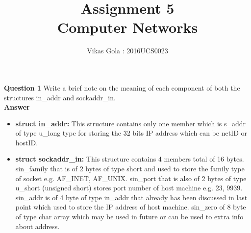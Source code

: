 \documentclass[14pt]{extarticle}
\begin{document}
    \pagestyle{plain}

    \title{\Huge Assignment 5\\ Computer Networks}
    \author{\huge Vikas Gola : 2016UCS0023}
    \maketitle
    \newpage

    \noindent
    \textbf{\large Question 1}
    Write a brief note on the meaning of each component of both the structures in\_addr and sockaddr\_in.\\[10pt]
    \textbf{\large Answer}
    \begin{itemize}
        \item \textbf{struct in\_addr:} This structure contains only one member which is s\_addr of type u\_long type
        for storing the 32 bits IP address which can be netID or hostID.
        \item \textbf{struct sockaddr\_in:} This structure contains 4 members total of 16 bytes. sin\_family that is of 2 bytes of type short and used to 
        store the family type of socket e.g. AF\_INET, AF\_UNIX. sin\_port that is also of 2 bytes of type u\_short (unsigned short) stores port number of
        host machine e.g. 23, 9939. sin\_addr is of 4 byte of type in\_addr that already has been discussed in last point which used to store the
        IP address of host machine. sin\_zero of 8 byte of type char array which may be used in future or can be used to extra info about address.
    \end{itemize}
    
    \vspace{1cm}
\end{document}
